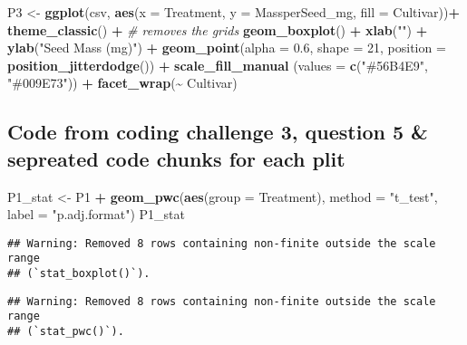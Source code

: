 \documentclass[
]{article}
\newenvironment{Shaded}{\begin{snugshade}}{\end{snugshade}}
\newcommand{\AttributeTok}[1]{\textcolor[rgb]{0.13,0.29,0.53}{#1}}
\newcommand{\CommentTok}[1]{\textcolor[rgb]{0.56,0.35,0.01}{\textit{#1}}}
\newcommand{\DecValTok}[1]{\textcolor[rgb]{0.00,0.00,0.81}{#1}}
\newcommand{\FloatTok}[1]{\textcolor[rgb]{0.00,0.00,0.81}{#1}}
\newcommand{\FunctionTok}[1]{\textcolor[rgb]{0.13,0.29,0.53}{\textbf{#1}}}
\newcommand{\NormalTok}[1]{#1}
\newcommand{\OtherTok}[1]{\textcolor[rgb]{0.56,0.35,0.01}{#1}}
\newcommand{\SpecialCharTok}[1]{\textcolor[rgb]{0.81,0.36,0.00}{\textbf{#1}}}
\newcommand{\StringTok}[1]{\textcolor[rgb]{0.31,0.60,0.02}{#1}}
\begin{document}
\begin{Shaded}
\begin{Highlighting}[]
\NormalTok{P3 }\OtherTok{\textless{}{-}} \FunctionTok{ggplot}\NormalTok{(csv, }\FunctionTok{aes}\NormalTok{(}\AttributeTok{x =}\NormalTok{ Treatment, }\AttributeTok{y =}\NormalTok{ MassperSeed\_mg, }\AttributeTok{fill =}\NormalTok{ Cultivar))}\SpecialCharTok{+}
  \FunctionTok{theme\_classic}\NormalTok{() }\SpecialCharTok{+}                \CommentTok{\# removes the grids}
  \FunctionTok{geom\_boxplot}\NormalTok{() }\SpecialCharTok{+} 
  \FunctionTok{xlab}\NormalTok{(}\StringTok{""}\NormalTok{) }\SpecialCharTok{+}
  \FunctionTok{ylab}\NormalTok{(}\StringTok{"Seed Mass (mg)"}\NormalTok{) }\SpecialCharTok{+}
  \FunctionTok{geom\_point}\NormalTok{(}\AttributeTok{alpha =} \FloatTok{0.6}\NormalTok{, }\AttributeTok{shape =} \DecValTok{21}\NormalTok{, }\AttributeTok{position =} \FunctionTok{position\_jitterdodge}\NormalTok{()) }\SpecialCharTok{+}
  \FunctionTok{scale\_fill\_manual}\NormalTok{ (}\AttributeTok{values =} \FunctionTok{c}\NormalTok{(}\StringTok{"\#56B4E9"}\NormalTok{, }\StringTok{"\#009E73"}\NormalTok{)) }\SpecialCharTok{+}
  \FunctionTok{facet\_wrap}\NormalTok{(}\SpecialCharTok{\textasciitilde{}}\NormalTok{ Cultivar)}
\end{Highlighting}
\end{Shaded}

\subsection{Code from coding challenge 3, question 5 \& sepreated code
chunks for each
plit}\label{code-from-coding-challenge-3-question-5-sepreated-code-chunks-for-each-plit}

\begin{Shaded}
\begin{Highlighting}[]
\NormalTok{P1\_stat }\OtherTok{\textless{}{-}}\NormalTok{ P1 }\SpecialCharTok{+} 
            \FunctionTok{geom\_pwc}\NormalTok{(}\FunctionTok{aes}\NormalTok{(}\AttributeTok{group =}\NormalTok{ Treatment), }\AttributeTok{method =} \StringTok{"t\_test"}\NormalTok{, }\AttributeTok{label =} \StringTok{"p.adj.format"}\NormalTok{)}
\NormalTok{P1\_stat}
\end{Highlighting}
\end{Shaded}

\begin{verbatim}
## Warning: Removed 8 rows containing non-finite outside the scale range
## (`stat_boxplot()`).
\end{verbatim}

\begin{verbatim}
## Warning: Removed 8 rows containing non-finite outside the scale range
## (`stat_pwc()`).
\end{verbatim}
\end{document}
